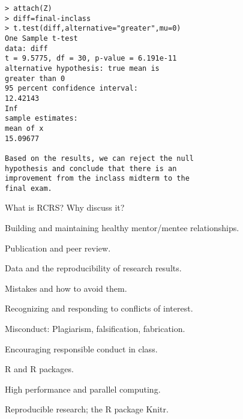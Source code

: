 \documentclass[portrait,11pt]{seminar}
\begin{document}
\begin{verbatim}
> attach(Z)
> diff=final-inclass
> t.test(diff,alternative="greater",mu=0)
One Sample t-test
data: diff
t = 9.5775, df = 30, p-value = 6.191e-11
alternative hypothesis: true mean is 
greater than 0
95 percent confidence interval:
12.42143
Inf
sample estimates:
mean of x
15.09677

Based on the results, we can reject the null 
hypothesis and conclude that there is an
improvement from the inclass midterm to the 
final exam.
\end{verbatim}
\es

\bs
\bi
\item
What is RCRS? Why discuss it?

\item
Building and maintaining healthy mentor/mentee relationships.

\item
Publication and peer review. 
\item
Data and the reproducibility of research results. 
\item
Mistakes and how to avoid them. 
\item
 Recognizing and responding to conflicts of interest.
\item
Misconduct: Plagiarism, falsification, fabrication. 
\item
 Encouraging responsible conduct in class.
\item
R and R packages.
\item
High performance and parallel computing.
\item
Reproducible research; the R package Knitr.
\ei
\es
\end{document}
